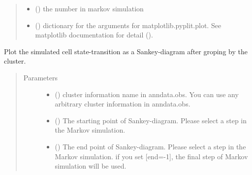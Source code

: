 \documentclass[letterpaper,10pt,english]{sphinxmanual}
\begin{document}
\begin{fulllineitems}
\begin{fulllineitems}
\begin{quote}
\begin{description}
\begin{itemize}
\item {} 
 () \textendash{} the number in markov simulation

\item {} 
 () \textendash{} dictionary for the arguments for matplotlib.pyplit.plot.
See matplotlib documentation for detail ().

\end{itemize}

\end{description}\end{quote}

\end{fulllineitems}


\begin{fulllineitems}
\label{\detokenize{modules/celloracle:celloracle.Oracle.plot_mc_resutls_as_sankey}}
Plot the simulated cell state-transition as a Sankey-diagram after groping by the cluster.
\begin{quote}\begin{description}
\item[{Parameters}] \leavevmode\begin{itemize}
\item {} 
 () \textendash{} cluster information name in anndata.obs.
You can use any arbitrary cluster information in anndata.obs.

\item {} 
 () \textendash{} The starting point of Sankey-diagram. Please select a  step in the Markov simulation.

\item {} 
 () \textendash{} The end point of Sankey-diagram. Please select a  step in the Markov simulation.
if you set {[}end=-1{]}, the final step of Markov simulation will be used.


\end{itemize}
\end{description}
\end{quote}
\end{fulllineitems}
\end{fulllineitems}
\end{document}
